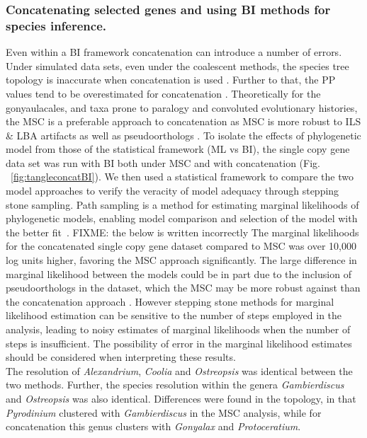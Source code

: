 \documentclass[fleqn,10pt,lineno]{wlpeerj} %
\begin{document}
\subsubsection*{Concatenating selected genes and using BI methods for species inference.}
Even within a BI framework concatenation can introduce a number of errors. 
Under simulated data sets, even under the coalescent methods, the species tree topology is inaccurate when concatenation is used \citep{kubatko2007inconsistency}. 
Further to that, the PP values tend to be overestimated for concatenation \citep{suzuki2002overcredibility}. 
Theoretically for the gonyaulacales, and taxa prone to paralogy and convoluted evolutionary histories, the MSC is a preferable approach to concatenation as MSC is more robust to ILS \& LBA artifacts as well as pseudoorthologs \citep{liu2014coalescent,du2019species}. 
To isolate the effects of phylogenetic model from those of the statistical framework (ML vs BI), the single copy gene data set was run with BI both under MSC and with concatenation (Fig. ~\ref{fig:tangleconcatBI}). 
We then used a statistical framework to compare the two model approaches to verify the veracity of model adequacy through stepping stone sampling. 
Path sampling is a method for estimating marginal likelihoods of phylogenetic models, enabling model comparison and selection of the model with the better fit~\citep{baele2012accurate}. 
FIXME: the below is written incorrectly
The marginal likelihoods for the concatenated single copy gene dataset compared to  MSC was over 10,000 log units higher, favoring the MSC approach significantly. 
The large difference in marginal likelihood between the models could be in part due to the inclusion of pseudoorthologs in the dataset, which the MSC may be more robust against than the concatenation approach \citep{du2019species,roch2015likelihood}.
However stepping stone methods for marginal likelihood estimation can be sensitive to the number of steps employed in the analysis, leading to noisy estimates of marginal likelihoods when the number of steps is insufficient. The possibility of error in the marginal likelihood estimates should be considered when interpreting these results. \\
The resolution of \textit{Alexandrium}, \textit{Coolia} and \textit{Ostreopsis} was identical between the two methods. 
Further, the species resolution within the genera \textit{Gambierdiscus} and \textit{Ostreopsis} was also identical. 
Differences were found in the topology, in that \textit{Pyrodinium} clustered with \textit{Gambierdiscus} in the MSC analysis, while for concatenation this genus clusters with \textit{Gonyalax} and \textit{Protoceratium}. 
\end{document}
